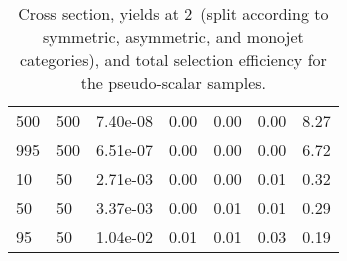 \begin{table}
\begin{tabular}{lllllll}
500       &   500       &   7.40e-08  &   0.00      &   0.00      &   0.00      &   8.27      \\ 
995       &   500       &   6.51e-07  &   0.00      &   0.00      &   0.00      &   6.72      \\ 
10        &   50        &   2.71e-03  &   0.00      &   0.00      &   0.01      &   0.32      \\ 
50        &   50        &   3.37e-03  &   0.00      &   0.01      &   0.01      &   0.29      \\ 
95        &   50        &   1.04e-02  &   0.01      &   0.01      &   0.03      &   0.19      \\ 
\hline
\end{tabular}
\caption{Cross section, yields at 2~\ifb (split according to symmetric, asymmetric, and monojet categories), and total selection efficiency for the pseudo-scalar \DMtt samples.}
\label{tab:dm_DMttP_g1_2fb}
\end{table}
